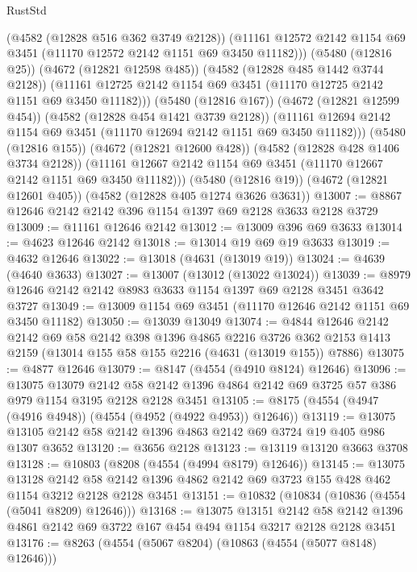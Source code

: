 \begin{lexlean}{RustStd}
\begin{coremodule}
            (@4582 (@12828 @516 @362 @3749 @2128))
            (@11161 @12572 @2142 @1154 @69 @3451 (@11170 @12572 @2142 @1151 @69 @3450 @11182)))
          (@5480 (@12816 @25))
          (@4672 (@12821 @12598 @485))
          (@4582 (@12828 @485 @1442 @3744 @2128))
          (@11161 @12725 @2142 @1154 @69 @3451 (@11170 @12725 @2142 @1151 @69 @3450 @11182)))
        (@5480 (@12816 @167))
        (@4672 (@12821 @12599 @454))
        (@4582 (@12828 @454 @1421 @3739 @2128))
        (@11161 @12694 @2142 @1154 @69 @3451 (@11170 @12694 @2142 @1151 @69 @3450 @11182)))
      (@5480 (@12816 @155))
      (@4672 (@12821 @12600 @428))
      (@4582 (@12828 @428 @1406 @3734 @2128))
      (@11161 @12667 @2142 @1154 @69 @3451 (@11170 @12667 @2142 @1151 @69 @3450 @11182)))
    (@5480 (@12816 @19))
    (@4672 (@12821 @12601 @405))
    (@4582 (@12828 @405 @1274 @3626 @3631))
@13007 := @8867 @12646 @2142 @2142 @396 @1154 @1397 @69 @2128 @3633 @2128 @3729
@13009 := @11161 @12646 @2142
@13012 := @13009 @396 @69 @3633
@13014 := @4623 @12646 @2142
@13018 := @13014 @19 @69 @19 @3633
@13019 := @4632 @12646
@13022 := @13018 (@4631 (@13019 @19))
@13024 := @4639 (@4640 @3633)
@13027 := @13007 (@13012 (@13022 @13024))
@13039 := @8979 @12646 @2142 @2142 @8983 @3633 @1154 @1397 @69 @2128 @3451 @3642 @3727
@13049 := @13009 @1154 @69 @3451 (@11170 @12646 @2142 @1151 @69 @3450 @11182)
@13050 := @13039 @13049
@13074 := @4844
    @12646
    @2142
    @2142
    @69
    @58
    @2142
    @398
    @1396
    @4865
    @2216
    @3726
    @362
    @2153
    @1413
    @2159
    (@13014 @155 @58 @155 @2216 (@4631 (@13019 @155)) @7886)
@13075 := @4877 @12646
@13079 := @8147 (@4554 (@4910 @8124) @12646)
@13096 := @13075
    @13079
    @2142
    @58
    @2142
    @1396
    @4864
    @2142
    @69
    @3725
    @57
    @386
    @979
    @1154
    @3195
    @2128
    @2128
    @3451
@13105 := @8175 (@4554 (@4947 (@4916 @4948)) (@4554 (@4952 (@4922 @4953)) @12646))
@13119 := @13075 @13105 @2142 @58 @2142 @1396 @4863 @2142 @69 @3724 @19 @405 @986 @1307 @3652
@13120 := @3656 @2128
@13123 := @13119 @13120 @3663 @3708
@13128 := @10803 (@8208 (@4554 (@4994 @8179) @12646))
@13145 := @13075
    @13128
    @2142
    @58
    @2142
    @1396
    @4862
    @2142
    @69
    @3723
    @155
    @428
    @462
    @1154
    @3212
    @2128
    @2128
    @3451
@13151 := @10832 (@10834 (@10836 (@4554 (@5041 @8209) @12646)))
@13168 := @13075
    @13151
    @2142
    @58
    @2142
    @1396
    @4861
    @2142
    @69
    @3722
    @167
    @454
    @494
    @1154
    @3217
    @2128
    @2128
    @3451
@13176 := @8263 (@4554 (@5067 @8204) (@10863 (@4554 (@5077 @8148) @12646)))

\end{coremodule}
\end{lexlean}
